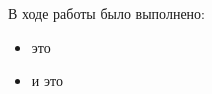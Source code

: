 \documentclass[pract, och, master]{SCWorks}
\begin{document}


 







  
\conclusion
В ходе работы было выполнено:
\begin{itemize}
    \item это
    \item и это
\end{itemize}


\end{document}
